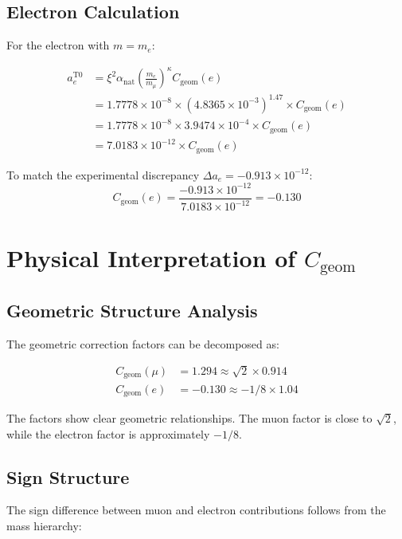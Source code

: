 \documentclass[12pt,a4paper]{article}
\newcommand{\xipar}{\xi}
\newcommand{\alphaNAT}{\alpha_{\text{nat}}}
\newcommand{\Cgeom}{C_{\text{geom}}}
\newcommand{\kappaT}{\kappa}
\newcommand{\mmu}{m_{\mu}}
\newcommand{\melec}{m_{e}}
\begin{document}
	\subsection{Electron Calculation}
	
	For the electron with $m = \melec$:
	
	\begin{align}
		a_e^{\text{T0}} &= \xipar^2 \alphaNAT \left(\frac{\melec}{\mmu}\right)^{\kappaT} \Cgeom(e) \\
		&= 1.7778 \times 10^{-8} \times (4.8365 \times 10^{-3})^{1.47} \times \Cgeom(e) \\
		&= 1.7778 \times 10^{-8} \times 3.9474 \times 10^{-4} \times \Cgeom(e) \\
		&= 7.0183 \times 10^{-12} \times \Cgeom(e)
	\end{align}
	
	To match the experimental discrepancy $\Delta a_e = -0.913 \times 10^{-12}$:
	\begin{equation}
		\Cgeom(e) = \frac{-0.913 \times 10^{-12}}{7.0183 \times 10^{-12}} = -0.130
	\end{equation}
	
	\section{Physical Interpretation of $\Cgeom$}
	
	\subsection{Geometric Structure Analysis}
	
	The geometric correction factors can be decomposed as:
	
	\begin{align}
		\Cgeom(\mu) &= 1.294 \approx \sqrt{2} \times 0.914 \\
		\Cgeom(e) &= -0.130 \approx -1/8 \times 1.04
	\end{align}
	
	The factors show clear geometric relationships. The muon factor is close to $\sqrt{2}$, while the electron factor is approximately $-1/8$.
	
	\subsection{Sign Structure}
	
	The sign difference between muon and electron contributions follows from the mass hierarchy:
	
\end{document}
